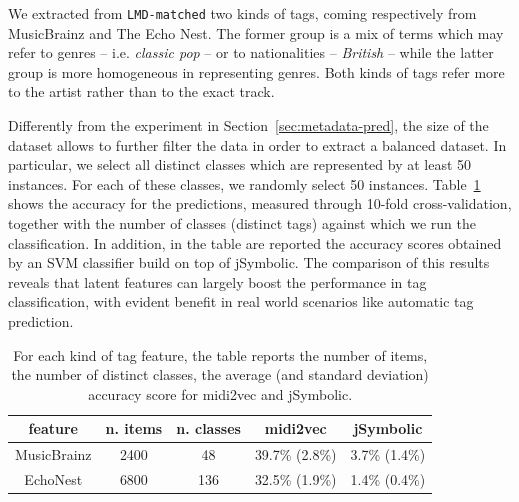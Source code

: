 \documentclass{article}
\newcommand{\secref}[1]{\mbox{Section~\ref{#1}}}
\newcommand{\tabref}[1]{\mbox{Table~\ref{#1}}}
\begin{document}

We extracted from \texttt{LMD-matched} two kinds of tags, coming respectively from MusicBrainz and The Echo Nest. The former group is a mix of terms which may refer to genres -- i.e. \textit{classic pop} -- or to nationalities -- \textit{British} -- while the latter group is more homogeneous in representing genres. Both kinds of tags refer more to the artist rather than to the exact track.

Differently from the experiment in \secref{sec:metadata-pred}, the size of the dataset allows to further filter the data in order to extract a balanced dataset. In particular, we select all distinct classes which are represented by at least 50 instances. For each of these classes, we randomly select 50 instances. \tabref{tab:accuracy-tag} shows the accuracy for the predictions, measured through 10-fold cross-validation, together with the number of classes (distinct tags) against which we run the classification. In addition, in the table are reported the accuracy scores obtained by an SVM classifier build on top of jSymbolic. The comparison of this results reveals that latent features can largely boost the performance in tag classification, with evident benefit in real world scenarios like automatic tag prediction.

\begin{table}[]
\centering
\begin{tabular}{|c|c|c|c|c|}
\hline
\textbf{feature} & \textbf{n. items} & \textbf{n. classes} & \textbf{midi2vec} & \textbf{jSymbolic} \\ \hline
MusicBrainz & 2400 & 48 & 39.7\% (2.8\%) & 3.7\% (1.4\%)\\ \hline
EchoNest & 6800 & 136 & 32.5\% (1.9\%) & 1.4\% (0.4\%)\\ \hline

\end{tabular}
\caption{For each kind of tag feature, the table reports the number of items, the number of distinct classes, the average (and standard deviation) accuracy score for midi2vec and jSymbolic.}
\label{tab:accuracy-tag}
\end{table}
\end{document}

